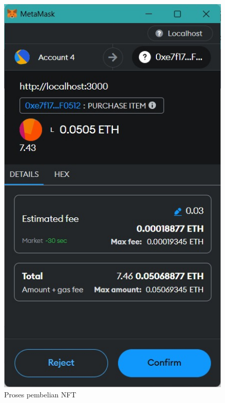       \begin{figure} [H] \centering
        \includegraphics[scale=0.45]{gambar/make_item.jpeg}
        \caption{Proses pembelian NFT}
        \label{fig:makeitem}
        \end{figure}
      

